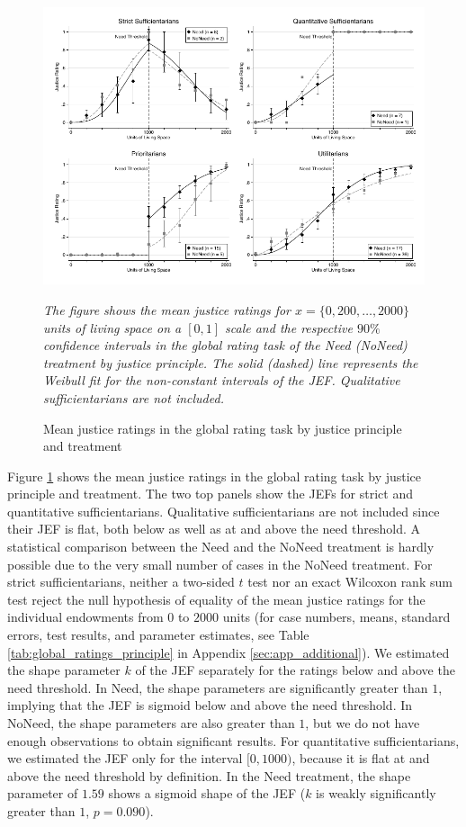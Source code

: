 \documentclass[12pt]{scrartcl}
\begin{document}
\begin{figure}[h!t!]
   \centering
   \includegraphics[width=\linewidth]{figures/figure_8.pdf}
   \begin{minipage}{\linewidth}
      \footnotesize
      \textit{The figure shows the mean justice ratings for $x=\{0,200,\ldots,2000\}$ units of living space on a $[0,1]$ scale and the respective $90\%$ confidence intervals in the global rating task of the Need (NoNeed) treatment by justice principle. The solid (dashed) line represents the Weibull fit for the non-constant intervals of the JEF. Qualitative sufficientarians are not included.}
   \end{minipage}
   \caption{Mean justice ratings in the global rating task by justice principle and treatment}
   \label{fig:figure_8}
\end{figure}

Figure \ref{fig:figure_8} shows the mean justice ratings in the global rating task by justice principle and treatment.
The two top panels show the JEFs for strict and quantitative sufficientarians.
Qualitative sufficientarians are not included since their JEF is flat, both below as well as at and above the need threshold.
A statistical comparison between the Need and the NoNeed treatment is hardly possible due to the very small number of cases in the NoNeed treatment.
For strict sufficientarians, neither a two-sided $t$ test nor an exact Wilcoxon rank sum test reject the null hypothesis of equality of the mean justice ratings for the individual endowments from $0$ to $2000$ units (for case numbers, means, standard errors, test results, and parameter estimates, see Table \ref{tab:global_ratings_principle} in Appendix \ref{sec:app_additional}).
We estimated the shape parameter $k$ of the JEF separately for the ratings below and above the need threshold.
In Need, the shape parameters are significantly greater than $1$, implying that the JEF is sigmoid below and above the need threshold.
In NoNeed, the shape parameters are also greater than $1$, but we do not have enough observations to obtain significant results.
For quantitative sufficientarians, we estimated the JEF only for the interval $[0,1000)$, because it is flat at and above the need threshold by definition.
In the Need treatment, the shape parameter of $1.59$ shows a sigmoid shape of the JEF ($k$ is weakly significantly greater than $1$, $p=0.090$).
\end{document}
